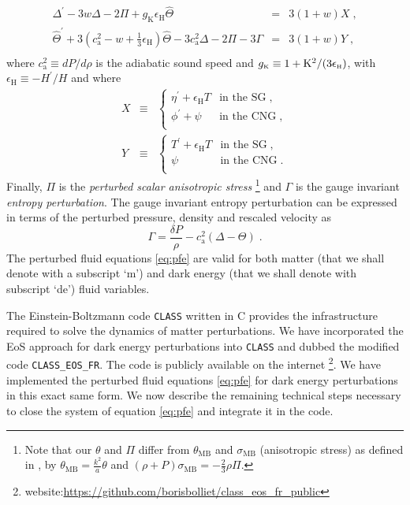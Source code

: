 \documentclass[nofootinbib,a4paper,aps,prd,10pt,superscriptaddress,reprint,showkeys,showpacs]{revtex4-1}
\newcommand{\qsubrm}[2]{{#1}_{\scriptscriptstyle{\textrm{#2}}}}
\def\be{\begin{equation}}
\def\ee{\end{equation}}
\def\bea{\begin{eqnarray}}
\def\eea{\end{eqnarray}}
\def\bse{\begin{subequations}}
\def\ese{\end{subequations}}
\begin{document}
\begin{eqnarray}\label{eq:pfe}
 \Delta^{\prime} - 3w\Delta - 2\Pi + \qsubrm{g}{K}\qsubrm{\epsilon}{H}\hat{\Theta} & = & 3(1+w)X\;, 
 \label{eq:deltadot}\nonumber \\
 \hat{\Theta}^\prime + 3\left(\qsubrm{c}{a}^2-w+\tfrac{1}{3}\qsubrm{\epsilon}{H}\right)\hat{\Theta} - 
 3\qsubrm{c}{a}^2\Delta - 2\Pi - 3\Gamma & = & 3(1+w)Y\;, \nonumber\label{eq:Thetadot}\\
\end{eqnarray}
where $\qsubrm{c}{a}^2\equiv dP/d\rho$ is the adiabatic sound speed and 
$\qsubrm{g}{K}\equiv 1+\rm{K}^2/(3\qsubrm{\epsilon}{H})$, with $\qsubrm{\epsilon}{H}\equiv -H^\prime/H$ and where
\bse
 \bea
  X & \equiv & \begin{cases}
   \eta^\prime + \qsubrm{\epsilon}{H}T & \mathrm{in}\,\,\mathrm{the}\,\,\mathrm{SG}\;, \\
   \phi^\prime + \psi & \mathrm{in}\,\,\mathrm{the}\,\, \mathrm{CNG}\;,\\
  \end{cases}\\
  Y & \equiv & \begin{cases}
   T^\prime+\qsubrm{\epsilon}{H}T & \mathrm{in}\,\,\mathrm{the}\,\,\mathrm{SG}\;,\\
   \psi & \mathrm{in}\,\,\mathrm{the}\,\,\mathrm{CNG}\;.\\
  \end{cases}
 \eea
\ese
Finally, $\Pi$ is the \textit{perturbed scalar anisotropic stress}
\footnote{\label{fn:MB}Note that our $\theta$ and $\Pi$ differ from $\qsubrm{\theta}{MB}$ and $\qsubrm{\sigma}{MB}$ 
(anisotropic stress) as defined in \cite{Ma1995}, by $\qsubrm{\theta}{MB}=\frac{k^2}{a}\theta$ and 
$(\rho+P)\qsubrm{\sigma}{MB}=-\tfrac{2}{3}\rho\Pi$.} 
and $\Gamma$ is the gauge invariant \textit{entropy perturbation}. The gauge invariant entropy perturbation can be 
expressed in terms of the perturbed pressure, density and rescaled velocity as
\be
 \Gamma = \frac{\delta P}{\rho} - \qsubrm{c}{a}^2(\Delta - \Theta)\;.
\ee
The perturbed fluid equations \eqref{eq:pfe} are valid for both matter (that we shall denote with a subscript `m') and 
dark energy (that we shall denote with subscript `de') fluid variables.

The Einstein-Boltzmann code \verb|CLASS| \citep{Lesgourgues2011a,Blas2011} written in C provides the infrastructure 
required to solve the dynamics of matter perturbations. We have incorporated the EoS approach for dark energy 
perturbations into \verb|CLASS| and dubbed the modified code \verb|CLASS_EOS_FR|. The code is publicly available on the 
internet \footnote{website:\href{https://github.com/borisbolliet/class_eos_fr_public}
{https://github.com/borisbolliet/class\_eos\_fr\_public}}. We have implemented the perturbed fluid equations 
\eqref{eq:pfe} for dark energy perturbations in this exact same form. We now describe the remaining technical steps 
necessary to close the system of equation \eqref{eq:pfe} and integrate it in the code.
\end{document}
